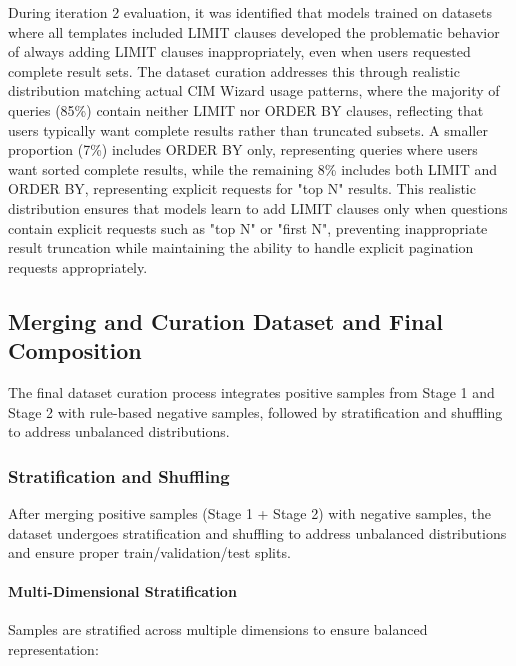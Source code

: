 During iteration 2 evaluation, it was identified that models trained on datasets where all templates included LIMIT clauses developed the problematic behavior of always adding LIMIT clauses inappropriately, even when users requested complete result sets. The dataset curation addresses this through realistic distribution matching actual CIM Wizard usage patterns, where the majority of queries (85\%) contain neither LIMIT nor ORDER BY clauses, reflecting that users typically want complete results rather than truncated subsets. A smaller proportion (7\%) includes ORDER BY only, representing queries where users want sorted complete results, while the remaining 8\% includes both LIMIT and ORDER BY, representing explicit requests for "top N" results. This realistic distribution ensures that models learn to add LIMIT clauses only when questions contain explicit requests such as "top N" or "first N", preventing inappropriate result truncation while maintaining the ability to handle explicit pagination requests appropriately.

\subsection{Merging and Curation Dataset and Final Composition}

The final dataset curation process integrates positive samples from Stage 1 and Stage 2 with rule-based negative samples, followed by stratification and shuffling to address unbalanced distributions.



\subsubsection{Stratification and Shuffling}

After merging positive samples (Stage 1 + Stage 2) with negative samples, the dataset undergoes stratification and shuffling to address unbalanced distributions and ensure proper train/validation/test splits.

\paragraph{Multi-Dimensional Stratification}

Samples are stratified across multiple dimensions to ensure balanced representation:

